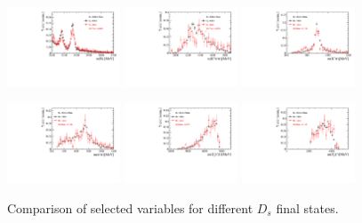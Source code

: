 \begin{figure}[h]
\includegraphics[height=!,width=0.3\textwidth]{figs/dataVsMC/finalState2_signal/Ds2all_Bs_DTF_MM.pdf}
\includegraphics[height=!,width=0.3\textwidth]{figs/dataVsMC/finalState2_signal/Ds2all_m_Kpipi.pdf}
\includegraphics[height=!,width=0.3\textwidth]{figs/dataVsMC/finalState2_signal/Ds2all_m_Kpi.pdf}

\includegraphics[height=!,width=0.3\textwidth]{figs/dataVsMC/finalState2_signal/Ds2all_m_pipi.pdf}
\includegraphics[height=!,width=0.3\textwidth]{figs/dataVsMC/finalState2_signal/Ds2all_m_Dspipi.pdf}
\includegraphics[height=!,width=0.3\textwidth]{figs/dataVsMC/finalState2_signal/Ds2all_m_Dspi.pdf}

\caption{Comparison of selected variables for different $D_s$ final states.}
\label{fig:}
\end{figure}

